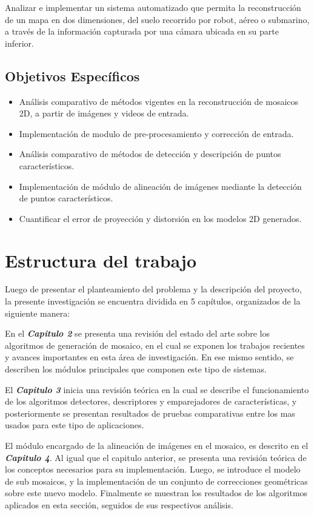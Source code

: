 Analizar e implementar un sistema automatizado que permita la reconstrucción de un mapa en dos dimensiones, del suelo recorrido por robot, aéreo o submarino, a través de la información capturada por una cámara ubicada en su parte inferior.

\subsection{Objetivos Específicos}

\begin{itemize}
	\item Análisis comparativo de métodos vigentes en la reconstrucción de mosaicos 2D, a partir de imágenes y videos de entrada.
	\item Implementación de modulo de pre-procesamiento y corrección de entrada.
	\item Análisis comparativo de métodos de detección y descripción de puntos característicos.
	\item Implementación de módulo de alineación de imágenes mediante la detección de puntos característicos.
	\item Cuantificar el error de proyección y distorsión en los modelos 2D generados.
\end{itemize}

\section{Estructura del trabajo}

Luego de presentar el planteamiento del problema y la descripción del proyecto, la presente investigación se encuentra dividida en 5 capítulos, organizados de la siguiente manera:

En el \textit{\textbf{Capitulo 2}} se presenta una revisión del estado del arte sobre los algoritmos de generación de mosaico, en el cual se exponen los trabajos recientes y avances importantes en esta área de investigación. En ese mismo sentido, se describen los módulos principales que componen este tipo de sistemas.

El \textit{\textbf{Capitulo 3}} inicia una revisión teórica en la cual se describe el funcionamiento de los algoritmos detectores, descriptores y emparejadores de características, y posteriormente se presentan resultados de pruebas comparativas entre los mas usados para este tipo de aplicaciones. 

El módulo encargado de la alineación de imágenes en el mosaico, es descrito en el \textit{\textbf{Capitulo 4}}. Al igual que el capitulo anterior, se presenta una revisión teórica de los conceptos necesarios para su implementación. Luego, se introduce el modelo de sub mosaicos, y la implementación de un conjunto de correcciones geométricas sobre este nuevo modelo. Finalmente se muestran los resultados de los algoritmos aplicados en esta sección, seguidos de sus respectivos análisis.

